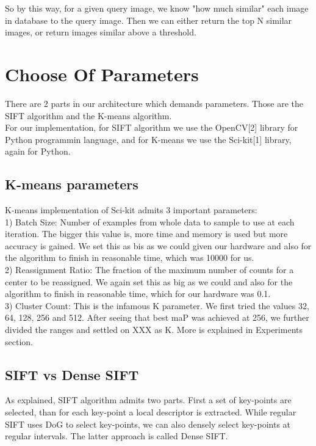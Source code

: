 \documentclass[conference,compsoc]{IEEEtran}
\begin{document}
So by this way, for a given query image, we know "how much similar" each image in database to the query image. Then we can either return the top N similar images, or return images similar above a threshold.

\section{Choose Of Parameters}

There are 2 parts in our architecture which demands parameters. Those are  the SIFT algorithm and the K-means algorithm.\\

For our implementation, for SIFT algorithm we use the OpenCV[2] library for Python programmin language, and for K-means we use the Sci-kit[1] library, again for Python.

\subsection{K-means parameters}

K-means implementation of Sci-kit admits 3 important parameters:\\

1) Batch Size: Number of examples from whole data to sample to use at each iteration. The bigger this value is, more time and memory is used but more accuracy is gained. We set this as bis as we could given our hardware and also for the algorithm to finish in reasonable time, which was 10000 for us. \\

2) Reassignment Ratio: The fraction of the maximum number of counts for a center to be reassigned. We again set this as big as we could and also for the algorithm to finish in reasonable time, which for our hardware was 0.1. \\

3) Cluster Count: This is the infamous K parameter. We first tried the values 32, 64, 128, 256 and 512. After seeing that best maP was achieved at 256, we further divided the ranges and settled on XXX as K. More is explained in Experiments section.

\subsection{SIFT vs Dense SIFT}

As explained, SIFT algorithm admits two parts. First a set of key-points are selected, than for each key-point a local descriptor is extracted. While regular SIFT uses DoG to select key-points, we can also densely select key-points at regular intervals. The latter approach is called Dense SIFT. \\
\end{document}

